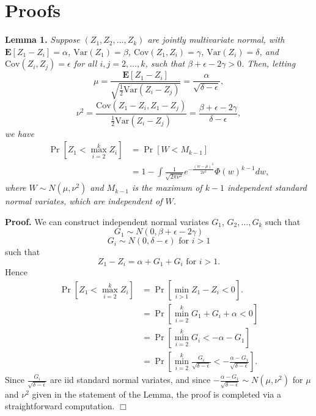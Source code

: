 \documentclass[12pt]{article}
\begin{document}
\maketitle

\newcommand{\tr}{\text{tr}}
\newcommand{\E}{\textbf{E}}
\newcommand{\diag}{\text{diag}}
\newcommand{\argmax}{\text{argmax}}
\newcommand{\Cov}{\text{Cov}}
\newcommand{\Var}{\text{Var}}
\newcommand{\argmin}{\text{argmin}}
\newcommand{\Vol}{\text{Vol}}
\newcommand{\comm}[1]{}
\newcommand{\indep}{\rotatebox[origin=c]{90}{$\models$}}
\newcommand{\Cor}{\text{Cor}}

\section{Proofs}

\textbf{Lemma 1. }
\emph{
Suppose $(Z_1, Z_2, \hdots, Z_k)$ are jointly multivariate normal, with 
$\E[Z_1 - Z_i]= \alpha$, 
$\Var(Z_1) = \beta$, 
$\Cov(Z_1, Z_i) = \gamma$, 
$\Var(Z_i)= \delta$, and $\Cov(Z_i, Z_j) = \epsilon$ for all $i, j = 2, \hdots,
k$, such that $\beta + \epsilon - 2\gamma > 0$.  Then, letting
\[
\mu = \frac{\E[Z_1 - Z_i]}{\sqrt{\frac{1}{2}\Var(Z_i - Z_j)}} = \frac{\alpha}{\sqrt{\delta - \epsilon}},
\]
\[
\nu^2 = \frac{\Cov(Z_1 -Z_i, Z_1 - Z_j)}{\frac{1}{2}\Var(Z_i - Z_j)} = \frac{\beta + \epsilon - 2\gamma}{\delta - \epsilon},
\]
we have
\begin{align*}
\Pr[Z_1 < \max_{i=2}^k Z_i] &= \Pr[W < M_{k-1}]
\\&= 1 - \int \frac{1}{\sqrt{2\pi\nu^2}} e^{-\frac{(w-\mu)^2}{2\nu^2}} \Phi(w)^{k-1} dw,
\end{align*}
where $W \sim N(\mu, \nu^2)$ and $M_{k-1}$ is the maximum of $k-1$
independent standard normal variates, which are independent of $W$.
}

\textbf{Proof.}
We can construct independent normal variates $G_1$, $G_2,\hdots, G_k$
such that
\[
G_1 \sim N(0, \beta + \epsilon - 2 \gamma)
\]
\[
G_i \sim N(0, \delta - \epsilon)\text{ for }i > 1
\]
such that
\[
Z_1 - Z_i = \alpha + G_1 + G_i \text{ for }i > 1.
\]
Hence
\begin{align*}
\Pr[Z_1 < \max_{i=2}^k Z_i] &= \Pr[\min_{i > 1} Z_1 - Z_i < 0].
\\&= \Pr[\min_{i=2}^{k} G_1 + G_i + \alpha < 0]
\\&= \Pr[\min_{i=2}^{k} G_i < -\alpha - G_1]
\\&= \Pr[\min_{i=2}^{k} \frac{G_i}{\sqrt{\delta - \epsilon}} < -\frac{\alpha - G_1}{\sqrt{\delta - \epsilon}}].
\end{align*}
Since $\frac{G_i}{\sqrt{\delta - \epsilon}}$ are iid standard normal variates, and since
$-\frac{\alpha - G_1}{\sqrt{\delta - \epsilon}} \sim N(\mu,\nu^2)$ for $\mu$ and $\nu^2$ given in the statement of the Lemma, the proof is completed via a straightforward computation.  $\Box$
\end{document}
